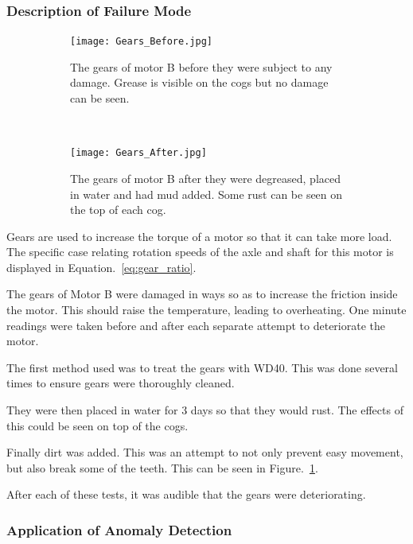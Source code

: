 \subsubsection{Description of Failure Mode}

\begin{figure}[t!]
    \centering
    \begin{subfigure}[t]{0.5\textwidth}
        \centering
        \texttt{[image: Gears\_Before.jpg]}
        \caption[Healthy Gears]{The gears of motor B before they were subject to any damage. Grease is visible on the cogs but no damage can be seen.}
    \end{subfigure}%
    ~ 
    \begin{subfigure}[t]{0.5\textwidth}
        \centering
         \texttt{[image: Gears\_After.jpg]}
    \caption[Damaged Gears]{The gears of motor B after they were degreased, placed in water and had mud added. Some rust can be seen on the top of each cog.}
    \end{subfigure}
    \caption[Motor Gears]{}
    \label{fig:gear_damage}
\end{figure}

Gears are used to increase the torque of a motor so that it can take more load. The specific case relating rotation speeds of the axle and shaft for this motor is displayed in Equation.~\eqref{eq:gear_ratio}.

The gears of Motor B were damaged in ways so as to increase the friction inside the motor. This should raise the temperature, leading to overheating. One minute readings were taken before and after each separate attempt to deteriorate the motor. 

The first method used was to treat the gears with WD40. This was done several times to ensure gears were thoroughly cleaned.

They were then placed in water for 3 days so that they would rust. The effects of this could be seen on top of the cogs.

Finally dirt was added. This was an attempt to not only prevent easy movement, but also break some of the teeth. This can be seen in Figure.~\ref{fig:gear_damage}.

After each of these tests, it was audible that the gears were deteriorating. 


\subsubsection{Application of Anomaly Detection}

